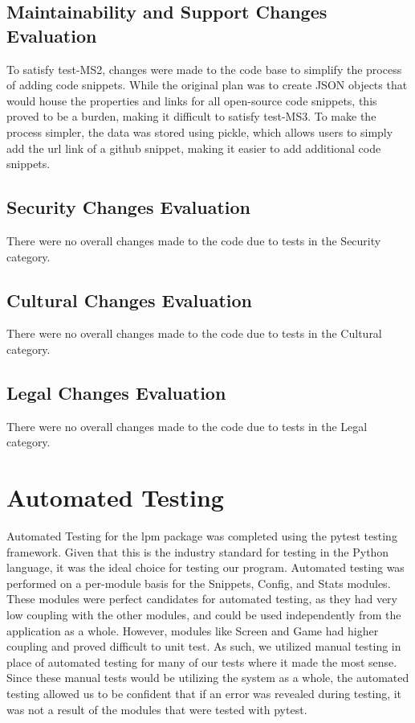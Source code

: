\documentclass[12pt, titlepage]{article}
\begin{document}
\subsection{Maintainability and Support Changes Evaluation}

To satisfy test-MS2, changes were made to the code base to simplify the process of adding code snippets. While the original plan was to create JSON objects that would house the properties and links for all open-source code snippets, this proved to be a burden, making it difficult to satisfy test-MS3. To make the process simpler, the data was stored using pickle, which allows users to simply add the url link of a github snippet, making it easier to add additional code snippets.

\subsection{Security Changes Evaluation}
There were no overall changes made to the code due to tests in the Security category.

\subsection{Cultural Changes Evaluation}
There were no overall changes made to the code due to tests in the Cultural category.

\subsection{Legal Changes Evaluation}
There were no overall changes made to the code due to tests in the Legal category.

\section{Automated Testing}
Automated Testing for the lpm package was completed using the pytest testing framework. Given that this is the industry standard for testing in the Python language, it was the ideal choice for testing our program. Automated testing was performed on a per-module basis for the Snippets, Config, and Stats modules. These modules were perfect candidates for automated testing, as they had very low coupling with the other modules, and could be used independently from the application as a whole. However, modules like Screen and Game had higher coupling and proved difficult to unit test. As such, we utilized manual testing in place of automated testing for many of our tests where it made the most sense. Since these manual tests would be utilizing the system as a whole, the automated testing allowed us to be confident that if an error was revealed during testing, it was not a result of the modules that were tested with pytest. \\
\end{document}
